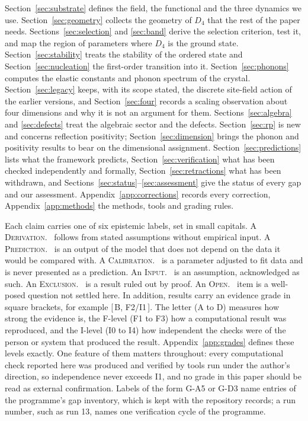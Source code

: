 \documentclass[a4paper,11pt]{article}
\makeatletter
\numberwithin{equation}{section}
\theoremstyle{jsplain}
\theoremstyle{jsrem}
\newcommand{\lbl}[1]{\textcolor{lbl@#1}{\textsc{#1}}.\ }
\newcommand{\grade}[1]{[\,#1\,]}
\makeatother
\begin{document}
Section~\ref{sec:substrate} defines the field, the functional and the three dynamics we use. Section~\ref{sec:geometry} collects the geometry of $D_4$ that the rest of the paper needs. Sections~\ref{sec:selection} and \ref{sec:band} derive the selection criterion, test it, and map the region of parameters where $D_4$ is the ground state. Section~\ref{sec:stability} treats the stability of the ordered state and Section~\ref{sec:nucleation} the first-order transition into it. Section~\ref{sec:phonons} computes the elastic constants and phonon spectrum of the crystal. Section~\ref{sec:legacy} keeps, with its scope stated, the discrete site-field action of the earlier versions, and Section~\ref{sec:four} records a scaling observation about four dimensions and why it is not an argument for them. Sections~\ref{sec:algebra} and \ref{sec:defects} treat the algebraic sector and the defects. Section~\ref{sec:rp} is new and concerns reflection positivity; Section~\ref{sec:dimension} brings the phonon and positivity results to bear on the dimensional assignment. Section~\ref{sec:predictions} lists what the framework predicts, Section~\ref{sec:verification} what has been checked independently and formally, Section~\ref{sec:retractions} what has been withdrawn, and Sections~\ref{sec:status}--\ref{sec:assessment} give the status of every gap and our assessment. Appendix~\ref{app:corrections} records every correction, Appendix~\ref{app:methods} the methods, tools and grading rules.

Each claim carries one of six epistemic labels, set in small capitals. A \lbl{Derivation} follows from stated assumptions without empirical input. A \lbl{Prediction} is an output of the model that does not depend on the data it would be compared with. A \lbl{Calibration} is a parameter adjusted to fit data and is never presented as a prediction. An \lbl{Input} is an assumption, acknowledged as such. An \lbl{Exclusion} is a result ruled out by proof. An \lbl{Open} item is a well-posed question not settled here. In addition, results carry an evidence grade in square brackets, for example \grade{B, F2/I1}. The letter (A to D) measures how strong the evidence is, the F-level (F1 to F3) how a computational result was reproduced, and the I-level (I0 to I4) how independent the checks were of the person or system that produced the result. Appendix~\ref{app:grades} defines these levels exactly. One feature of them matters throughout: every computational check reported here was produced and verified by tools run under the author's direction, so independence never exceeds I1, and no grade in this paper should be read as external confirmation. Labels of the form G-A5 or G-D3 name entries of the programme's gap inventory, which is kept with the repository records; a run number, such as run 13, names one verification cycle of the programme.
\end{document}
